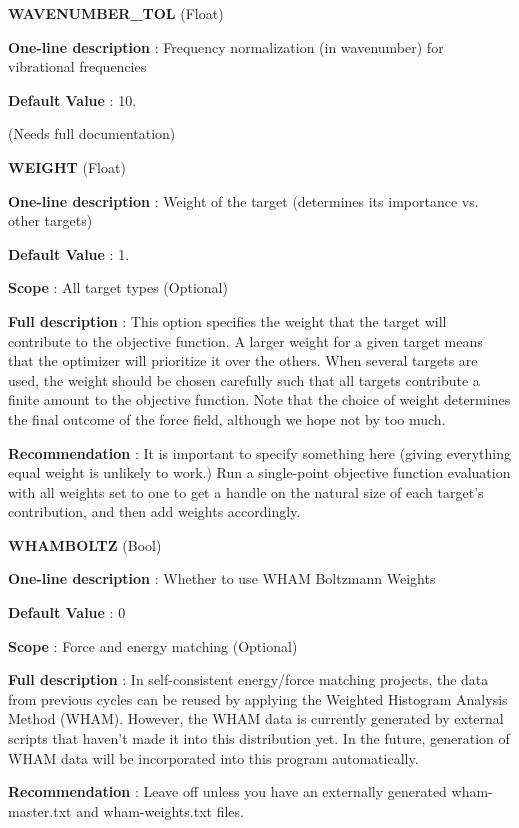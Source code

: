 \begin{DoxyItemize}
\item {\bfseries  W\-A\-V\-E\-N\-U\-M\-B\-E\-R\-\_\-\-T\-O\-L } (Float) \par
{\bfseries  One-\/line description }\-: Frequency normalization (in wavenumber) for vibrational frequencies \par
{\bfseries  Default Value }\-: 10. \par
(Needs full documentation)\end{DoxyItemize}
\begin{DoxyItemize}
\item {\bfseries  W\-E\-I\-G\-H\-T } (Float) \par
{\bfseries  One-\/line description }\-: Weight of the target (determines its importance vs. other targets) \par
{\bfseries  Default Value }\-: 1. \par
{\bfseries  Scope }\-: All target types (Optional) \par
{\bfseries  Full description }\-: This option specifies the weight that the target will contribute to the objective function. A larger weight for a given target means that the optimizer will prioritize it over the others. When several targets are used, the weight should be chosen carefully such that all targets contribute a finite amount to the objective function. Note that the choice of weight determines the final outcome of the force field, although we hope not by too much. \par
{\bfseries  Recommendation }\-: It is important to specify something here (giving everything equal weight is unlikely to work.) Run a single-\/point objective function evaluation with all weights set to one to get a handle on the natural size of each target's contribution, and then add weights accordingly.\end{DoxyItemize}
\begin{DoxyItemize}
\item {\bfseries  W\-H\-A\-M\-B\-O\-L\-T\-Z } (Bool) \par
{\bfseries  One-\/line description }\-: Whether to use W\-H\-A\-M Boltzmann Weights \par
{\bfseries  Default Value }\-: 0 \par
{\bfseries  Scope }\-: Force and energy matching (Optional) \par
{\bfseries  Full description }\-: In self-\/consistent energy/force matching projects, the data from previous cycles can be reused by applying the Weighted Histogram Analysis Method (W\-H\-A\-M). However, the W\-H\-A\-M data is currently generated by external scripts that haven't made it into this distribution yet. In the future, generation of W\-H\-A\-M data will be incorporated into this program automatically. \par
{\bfseries  Recommendation }\-: Leave off unless you have an externally generated wham-\/master.\-txt and wham-\/weights.\-txt files.\end{DoxyItemize}

